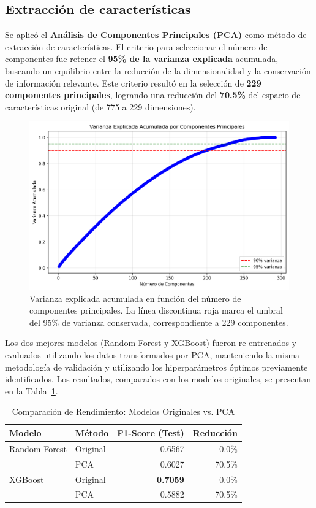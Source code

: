 \documentclass[journal]{IEEEtai}
\begin{document}
\subsection{Extracción de características}
Se aplicó el \textbf{Análisis de Componentes Principales (PCA)} como método de extracción de características. El criterio para seleccionar el número de componentes fue retener el \textbf{95\% de la varianza explicada} acumulada, buscando un equilibrio entre la reducción de la dimensionalidad y la conservación de información relevante. Este criterio resultó en la selección de \textbf{229 componentes principales}, logrando una reducción del \textbf{70.5\%} del espacio de características original (de 775 a 229 dimensiones).

\begin{figure}[!t]
\centering
\includegraphics[width=\columnwidth]{graficas/pca_varianza_explicada.png}
\caption{Varianza explicada acumulada en función del número de componentes principales. La línea discontinua roja marca el umbral del 95\% de varianza conservada, correspondiente a 229 componentes.}
\label{fig:pca_variance}
\end{figure}

Los dos mejores modelos (Random Forest y XGBoost) fueron re-entrenados y evaluados utilizando los datos transformados por PCA, manteniendo la misma metodología de validación y utilizando los hiperparámetros óptimos previamente identificados. Los resultados, comparados con los modelos originales, se presentan en la Tabla~\ref{tab:pca_results}.

\begin{table}[!ht]
\centering
\caption{Comparación de Rendimiento: Modelos Originales vs. PCA}
\label{tab:pca_results}
\begin{tabular}{llrr}
\toprule
\textbf{Modelo} & \textbf{Método} & \textbf{F1-Score (Test)} & \textbf{Reducción} \\
\midrule
Random Forest & Original & 0.6567 & 0.0\% \\
 & PCA & 0.6027 & 70.5\% \\
\addlinespace
XGBoost & Original & \textbf{0.7059} & 0.0\% \\
 & PCA & 0.5882 & 70.5\% \\
\bottomrule
\end{tabular}
\end{table}
\end{document}
